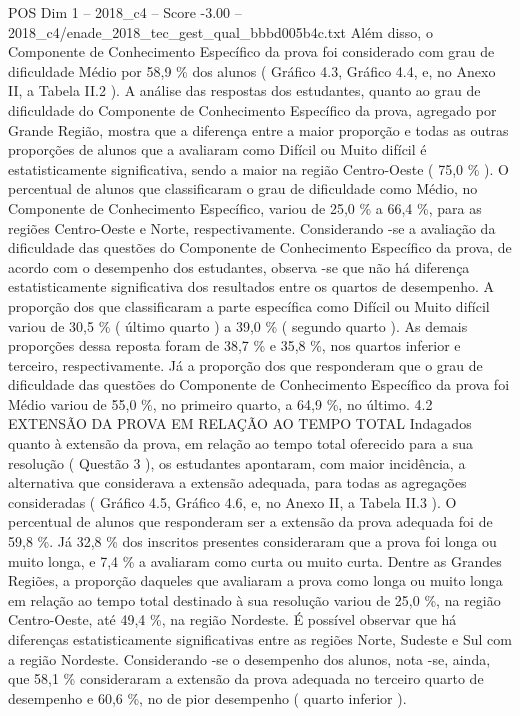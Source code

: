 \begin{textsample}{POS Dim 1 – 2018\_c4 – Score -3.00 – 2018\_c4/enade\_2018\_tec\_gest\_qual\_bbbd005b4c.txt}
Além disso, o Componente de Conhecimento Específico da prova foi considerado com grau de dificuldade Médio por 58,9 \% dos alunos ( Gráfico 4.3, Gráfico 4.4, e, no Anexo II, a Tabela II.2 ).
A análise das respostas dos estudantes, quanto ao grau de dificuldade do Componente de Conhecimento Específico da prova, agregado por Grande Região, mostra que a diferença entre a maior proporção e todas as outras proporções de alunos que a avaliaram como Difícil ou Muito difícil é estatisticamente significativa, sendo a maior na região Centro-Oeste ( 75,0 \% ).
O percentual de alunos que classificaram o grau de dificuldade como Médio, no Componente de Conhecimento Específico, variou de 25,0 \% a 66,4 \%, para as regiões Centro-Oeste e Norte, respectivamente.
Considerando -se a avaliação da dificuldade das questões do Componente de Conhecimento Específico da prova, de acordo com o desempenho dos estudantes, observa -se que não há diferença estatisticamente significativa dos resultados entre os quartos de desempenho.
A proporção dos que classificaram a parte específica como Difícil ou Muito difícil variou de 30,5 \% ( último quarto ) a 39,0 \% ( segundo quarto ).
As demais proporções dessa reposta foram de 38,7 \% e 35,8 \%, nos quartos inferior e terceiro, respectivamente.
Já a proporção dos que responderam que o grau de dificuldade das questões do Componente de Conhecimento Específico da prova foi Médio variou de 55,0 \%, no primeiro quarto, a 64,9 \%, no último. 4.2 EXTENSÃO DA PROVA EM RELAÇÃO AO TEMPO TOTAL Indagados quanto à extensão da prova, em relação ao tempo total oferecido para a sua resolução ( Questão 3 ), os estudantes apontaram, com maior incidência, a alternativa que considerava a extensão adequada, para todas as agregações consideradas ( Gráfico 4.5, Gráfico 4.6, e, no Anexo II, a Tabela II.3 ).
O percentual de alunos que responderam ser a extensão da prova adequada foi de 59,8 \%.
Já 32,8 \% dos inscritos presentes consideraram que a prova foi longa ou muito longa, e 7,4 \% a avaliaram como curta ou muito curta.
Dentre as Grandes Regiões, a proporção daqueles que avaliaram a prova como longa ou muito longa em relação ao tempo total destinado à sua resolução variou de 25,0 \%, na região Centro-Oeste, até 49,4 \%, na região Nordeste.
É possível observar que há diferenças estatisticamente significativas entre as regiões Norte, Sudeste e Sul com a região Nordeste.
Considerando -se o desempenho dos alunos, nota -se, ainda, que 58,1 \% consideraram a extensão da prova adequada no terceiro quarto de desempenho e 60,6 \%, no de pior desempenho ( quarto inferior ).

\end{textsample}
